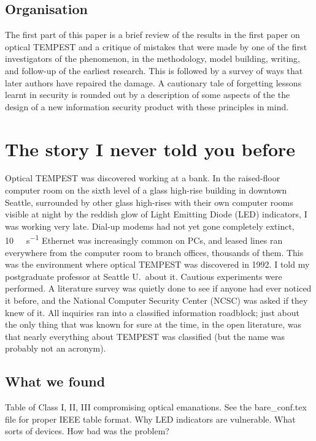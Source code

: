 \documentclass[conference]{IEEEtran}
\begin{document}
\subsection{Organisation}

The first part of this paper is a brief review of the results in the first
paper on optical TEMPEST and a critique of mistakes that were made by one
of the first investigators of the phenomenon, in the methodology, model
building, writing, and follow-up of the earliest research. This is followed
by a survey of ways that later authors have repaired the damage. A cautionary
tale of forgetting lessons learnt in security is rounded out by a description
of some aspects of the the design of a new information security product with
these principles in mind.

\section{The story I never told you before}

Optical TEMPEST was discovered working at a bank. In the raised-floor
computer room on the sixth level of a glass high-rise building in downtown
Seattle, surrounded by other glass high-rises with their own computer rooms
visible at night by the reddish glow of Light Emitting Diode (LED)
indicators, I was working very late. Dial-up modems had not yet gone
completely extinct, \SI{10}{\mega\bit\per\second} Ethernet was increasingly
common on PCs, and leased lines ran everywhere from the computer room to
branch offices, thousands of them. This was the environment where optical
TEMPEST was discovered in 1992. I told my postgraduate professor at Seattle
U.\ about it. Cautious experiments were performed. A literature survey was
quietly done to see if anyone had ever noticed it before, and the National
Computer Security Center (NCSC) was asked if they knew of it. All inquiries
ran into a classified information roadblock; just about the only thing that
was known for sure at the time, in the open literature, was that nearly
everything about TEMPEST was classified (but the name was probably not an
acronym).

\subsection{What we found}

Table of Class I, II, III compromising optical emanations. See the
bare_conf.tex file for proper IEEE table format. Why LED indicators are
vulnerable. What sorts of devices. How bad was the problem?
\end{document}
